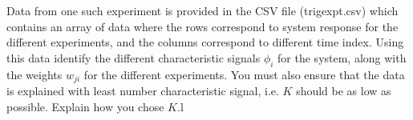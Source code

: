 \begin{enumerate}[resume]
    Data from one such experiment is provided in the CSV file (trigexpt.csv) which contains an array of data where the rows correspond to system response for the different experiments, and the columns correspond to  different time index. Using this data identify the different characteristic signals $\phi_i$ for the system, along with the weights $w_{ji}$ for the different experiments. You must also ensure that the data is explained with least number characteristic signal, i.e. $K$ should be as low as possible. Explain how you chose $K$.l
\end{enumerate}
